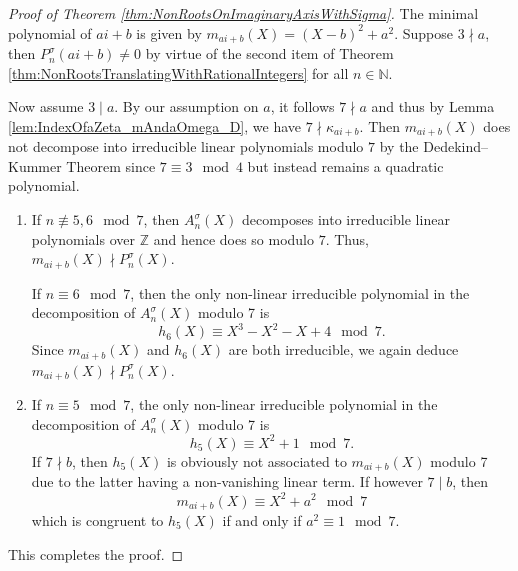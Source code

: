 \documentclass[10pt,a4paper]{amsart}
\newcommand{\N}{\mathbb{N}}
\newcommand{\Z}{\mathbb{Z}}
\begin{document}
\begin{proof}[Proof of Theorem \ref{thm:NonRootsOnImaginaryAxisWithSigma}]
    The minimal polynomial of $ai + b$ is given by $m_{ai + b}(X) = (X - b)^2 + a^2$. Suppose $3 \nmid a$, then $P_n^\sigma(ai + b) \neq 0$ by virtue of the second item of Theorem \ref{thm:NonRootsTranslatingWithRationalIntegers} for all $n \in \N$. 
     
    Now assume $3 \mid a$. By our assumption on $a$, it follows $7 \nmid a$ and thus by Lemma \ref{lem:IndexOfaZeta_mAndaOmega_D}, we have $7 \nmid \kappa_{ai + b}$. Then $m_{ai + b}(X)$ does not decompose into irreducible linear polynomials modulo $7$ by the Dedekind--Kummer Theorem since $7 \equiv 3 \mod 4$ but instead remains a quadratic polynomial.
    \begin{enumerate}
        \item If $n \not \equiv 5, 6 \mod 7$, then $A_n^\sigma(X)$ decomposes into irreducible linear polynomials over $\Z$ and hence does so modulo $7$. Thus, $m_{ai + b}(X) \nmid P_n^\sigma(X)$.

        If $n \equiv 6 \mod 7$, then the only non-linear irreducible polynomial in the decomposition of $A_n^\sigma(X)$ modulo 7 is
        \[h_6(X) \equiv X^3 - X^2 - X + 4 \mod 7.\]
        Since $m_{ai +b}(X)$ and $h_6(X)$ are both irreducible, we again deduce $m_{ai+b}(X) \nmid P_n^\sigma(X)$.
        \item If $n \equiv 5 \mod 7$, the only non-linear irreducible polynomial in the decomposition of $A_n^\sigma(X)$ modulo 7 is
        \[h_5(X) \equiv X^2 + 1 \mod 7.\]
        If $7 \nmid b$, then $h_5(X)$ is obviously not associated to $m_{ai + b}(X)$ modulo 7 due to the latter having a non-vanishing linear term. If however $7 \mid b$, then
        \[m_{ai + b}(X) \equiv X^2 + a^2 \mod 7\]
        which is congruent to $h_5(X)$ if and only if $a^2 \equiv 1 \mod 7$.
    \end{enumerate}
    This completes the proof.
\end{proof}
\end{document}
